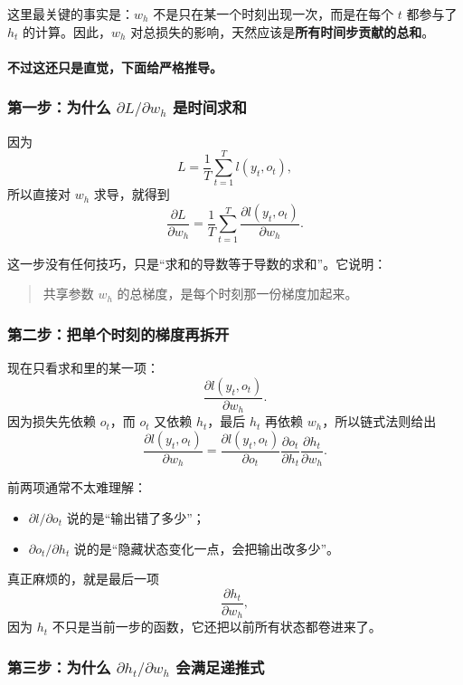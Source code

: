 \documentclass[12pt,a4paper]{ctexart}
\begin{document}
这里最关键的事实是：\(w_h\) 不是只在某一个时刻出现一次，而是在每个 \(t\) 都参与了 \(h_t\) 的计算。因此，\(w_h\) 对总损失的影响，天然应该是\textbf{所有时间步贡献的总和}。

\paragraph{不过这还只是直觉，下面给严格推导。}

\subsubsection*{第一步：为什么 \(\partial L / \partial w_h\) 是时间求和}

因为
\[
L = \frac{1}{T}\sum_{t=1}^{T} l(y_t, o_t),
\]
所以直接对 \(w_h\) 求导，就得到
\[
\frac{\partial L}{\partial w_h}
=
\frac{1}{T}\sum_{t=1}^{T}
\frac{\partial l(y_t, o_t)}{\partial w_h}.
\]

这一步没有任何技巧，只是“求和的导数等于导数的求和”。它说明：
\begin{quote}
共享参数 \(w_h\) 的总梯度，是每个时刻那一份梯度加起来。
\end{quote}

\subsubsection*{第二步：把单个时刻的梯度再拆开}

现在只看求和里的某一项：
\[
\frac{\partial l(y_t, o_t)}{\partial w_h}.
\]
因为损失先依赖 \(o_t\)，而 \(o_t\) 又依赖 \(h_t\)，最后 \(h_t\) 再依赖 \(w_h\)，所以链式法则给出
\[
\frac{\partial l(y_t, o_t)}{\partial w_h}
=
\frac{\partial l(y_t, o_t)}{\partial o_t}
\frac{\partial o_t}{\partial h_t}
\frac{\partial h_t}{\partial w_h}.
\]

前两项通常不太难理解：
\begin{itemize}
  \item \(\partial l / \partial o_t\) 说的是“输出错了多少”；
  \item \(\partial o_t / \partial h_t\) 说的是“隐藏状态变化一点，会把输出改多少”。
\end{itemize}

真正麻烦的，就是最后一项
\[
\frac{\partial h_t}{\partial w_h},
\]
因为 \(h_t\) 不只是当前一步的函数，它还把以前所有状态都卷进来了。

\subsubsection*{第三步：为什么 \(\partial h_t / \partial w_h\) 会满足递推式}
\end{document}
